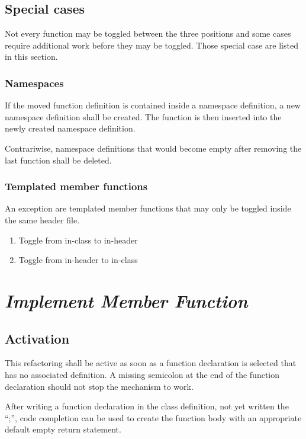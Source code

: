 \subsection{Special cases}

Not every function may be toggled between the three positions and some cases 
require additional work before they may be toggled. Those special case are 
listed in this section.

\subsubsection{Namespaces}

If the moved function definition is contained inside a namespace definition, a 
new namespace definition shall be created. The function is then inserted into 
the newly created namespace definition.

Contrariwise, namespace definitions that would become empty after removing the 
last function shall be deleted.

\subsubsection{Templated member functions}

An exception are templated member functions that may only be toggled inside the 
same header file.
\begin{enumerate}
\item Toggle from in-class to in-header
\item Toggle from in-header to in-class
\end{enumerate}

\section{\textit{Implement Member Function}}

\subsection{Activation}
This refactoring shall be active as soon as a function declaration is selected 
that has no associated definition. A missing semicolon at the end of the 
function declaration should not stop the mechanism to work.

After writing a function declaration in the class definition, not yet written
the ``;'', code completion can be used to create the function body with an
appropriate default empty return statement.\newline

